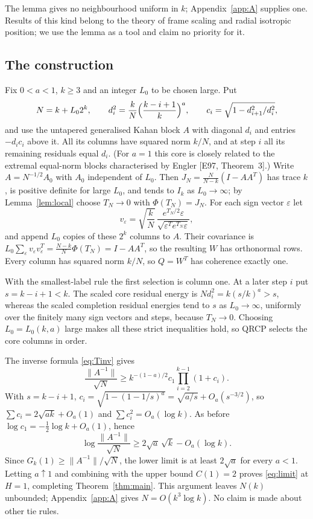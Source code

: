 \documentclass[11pt,a4paper]{article}
\theoremstyle{definition}
\numberwithin{equation}{section}
\begin{document}
The lemma gives no neighbourhood uniform in $k$; Appendix~\ref{app:A} supplies one. Results of this kind belong to the
theory of frame scaling and radial isotropic position; we use the lemma as a tool and claim no priority for it.

\subsection{The construction}
Fix $0<a<1$, $k\ge3$ and an integer $L_0$ to be chosen large. Put
\begin{equation}\label{eq:endpoint-d}
 N=k+L_02^k,\qquad d_i^2=\frac kN\Bigl(\frac{k-i+1}k\Bigr)^a,\qquad c_i=\sqrt{1-d_{i+1}^2/d_i^2},
\end{equation}
and use the untapered generalised Kahan block $A$ with diagonal $d_i$ and entries $-d_ic_i$ above it. All its
columns have squared norm $k/N$, and at step $i$ all its remaining residuals equal $d_i$. (For $a=1$ this core is
closely related to the extremal equal-norm blocks characterised by Engler [E97, Theorem~3].) Write
$A=N^{-1/2}A_0$ with $A_0$ independent of $L_0$. Then $J_N=\frac N{N-k}(I-AA^T)$ has trace $k$, is positive definite
for large $L_0$, and tends to $I_k$ as $L_0\to\infty$; by Lemma~\ref{lem:local} choose $T_N\to0$ with
$\Phi(T_N)=J_N$. For each sign vector $\varepsilon$ let
\begin{equation}\label{eq:veps}
 v_\varepsilon=\sqrt{\frac kN}\,\frac{e^{T_N/2}\varepsilon}{\sqrt{\varepsilon^Te^{T_N}\varepsilon}},
\end{equation}
and append $L_0$ copies of these $2^k$ columns to $A$. Their covariance is
$L_0\sum_\varepsilon v_\varepsilon v_\varepsilon^T=\frac{N-k}N\Phi(T_N)=I-AA^T$, so the resulting $W$ has orthonormal
rows. Every column has squared norm $k/N$, so $Q=W^T$ has coherence exactly one.

With the smallest-label rule the first selection is column one. At a later step $i$ put $s=k-i+1<k$. The scaled core
residual energy is $Nd_i^2=k(s/k)^a>s$, whereas the scaled completion residual energies tend to $s$ as
$L_0\to\infty$, uniformly over the finitely many sign vectors and steps, because $T_N\to0$. Choosing $L_0=L_0(k,a)$
large makes all these strict inequalities hold, so QRCP selects the core columns in order.

The inverse formula \eqref{eq:Tinv} gives
\begin{equation}\label{eq:endpoint-gamma}
 \frac{\|A^{-1}\|}{\sqrt N}\ge k^{-(1-a)/2}c_1\prod_{i=2}^{k-1}(1+c_i).
\end{equation}
With $s=k-i+1$, $c_i=\sqrt{1-(1-1/s)^a}=\sqrt{a/s}+O_a(s^{-3/2})$, so $\sum c_i=2\sqrt{ak}+O_a(1)$ and
$\sum c_i^2=O_a(\log k)$. As before $\log c_1=-\tfrac12\log k+O_a(1)$, hence
\begin{equation}\label{eq:endpoint-final}
 \log\frac{\|A^{-1}\|}{\sqrt N}\ge2\sqrt a\,\sqrt k-O_a(\log k).
\end{equation}
Since $G_k(1)\ge\|A^{-1}\|/\sqrt N$, the lower limit is at least $2\sqrt a$ for every $a<1$. Letting $a\uparrow1$ and
combining with the upper bound $C(1)=2$ proves \eqref{eq:limit} at $H=1$, completing Theorem~\ref{thm:main}. This
argument leaves $N(k)$ unbounded; Appendix~\ref{app:A} gives $N=O(k^3\log k)$. No claim is made about other tie rules.
\end{document}
